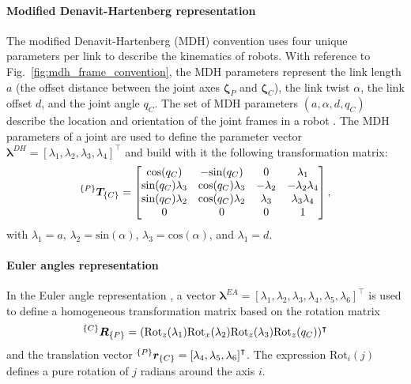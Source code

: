 \paragraph*{Modified Denavit-Hartenberg representation} The modified Denavit-Hartenberg (MDH) convention uses four unique parameters per link to describe the kinematics of robots. With reference to Fig.~\ref{fig:mdh_frame_convention}, the MDH parameters represent the
link length $a$ (the offset distance between the joint axes $\bm{\zeta}_P$ and $\bm{\zeta}_C$), the link twist $\alpha$, the link offset $d$, and the joint angle $q_C$. The set of MDH parameters $\left(a,\alpha,d,q_C\right)$ describe the location and orientation of the joint frames in a robot \cite{Craig1989Introductionroboticsmechanics}. The MDH parameters of a joint are used to define the parameter vector  $\bm{\lambda}^{DH} = \left[\lambda_1,\lambda_2,\lambda_3,\lambda_4\right]^\intercal$ and build with it the following transformation matrix:
\begin{equation}
 ^{\left\lbrace P \right\rbrace}\bm{T}_{\left\lbrace C \right\rbrace} =
 \begin{bmatrix}
   	\text{cos}(q_C)         &     -\text{sin}(q_C)    &      0    &      \lambda_1\\      
   	\text{sin}(q_C)\lambda_3& \text{cos}(q_C)\lambda_3& -\lambda_2& -\lambda_2\lambda_4\\
   	\text{sin}(q_C)\lambda_2& \text{cos}(q_C)\lambda_2&  \lambda_3&  \lambda_3\lambda_4\\
   	0                       &         0               &      0    &           1          
 \end{bmatrix},
\end{equation} 
with $\lambda_1 = a$, $\lambda_2 = \text{sin}(\alpha)$, $\lambda_3 = \text{cos}(\alpha)$, and $\lambda_1 = d$. 

\paragraph*{Euler angles representation} In the Euler angle representation , a vector $\bm{\lambda}^{EA} = \left[\lambda_1,\lambda_2,\lambda_3,\lambda_4,\lambda_5,\lambda_6\right]^\intercal$ is used to define a homogeneous transformation matrix based on the rotation matrix
\begin{equation}
	      ^{\left\lbrace C \right\rbrace}\bm{R}_{\left\lbrace P \right\rbrace} = (\text{Rot}_z(\lambda_1)\text{Rot}_x(\lambda_2)\text{Rot}_z(\lambda_3)\text{Rot}_z(q_C))^\intercal
\end{equation}
and the translation vector $ ^{\left\lbrace P \right\rbrace}\bm{r}_{\left\lbrace C \right\rbrace} = \left[\lambda_4,\lambda_5,\lambda_6\right]^\intercal $. The expression $\text{Rot}_i(j)$ defines a pure rotation of $j$ radians around the axis $i$. 


